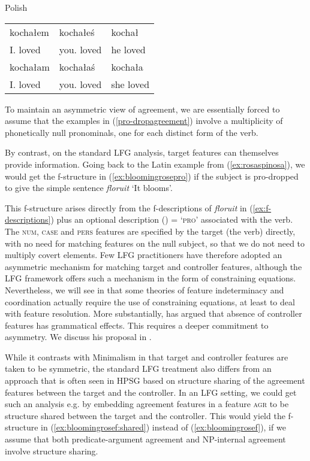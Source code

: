 \documentclass[output=paper,hidelinks]{langscibook}
\begin{document}
\ea\label{pro-dropagreement}Polish\\
\begin{tabular}[t]{lll}
  kocha\l{}em & kocha\l{}e\'{s} & kocha\l \\
  I.{\M} loved & you.{\M} loved & he loved \\
  kocha\l{}am & kocha\l{}a\'{s} & kocha\l{}a\\
  I.{\F} loved & you.{\F} loved & she loved \\
\end{tabular}
\z
%
To maintain an asymmetric view of agreement, we are essentially forced
to assume that the examples in (\ref{pro-dropagreement}) involve a multiplicity of
phonetically null pronominals, one for each distinct form of the
verb.

By contrast, on the standard LFG analysis, target features can themselves
provide information. Going back to the Latin example from
(\ref{ex:rosaspinosa}), we would get the f-structure in (\ref{ex:bloomingrosepro}) if the
subject is pro-dropped to give the simple sentence \textit{floruit} `It blooms'.

%
This f-structure arises directly from the f-descriptions of
\textit{floruit} in (\ref{ex:f-descriptions}) plus an optional
description (\UP\SUBJ\PRED) = \textsc{`pro'} associated with the
verb. The \textsc{num, case} and \textsc{pers} features are specified
by the target (the verb) directly, with no need for matching features
on the null subject, so that we do not need to multiply covert
elements.  Few LFG practitioners have therefore adopted an asymmetric
mechanism for matching target and controller features, although the
LFG framework offers such a mechanism in the form of constraining
equations. Nevertheless, we will see in 
that some theories of feature indeterminacy and coordination actually
require the use of constraining equations, at least to deal with
feature resolution. More substantially, \citet{Wechsler:Mixed} has
argued that absence of controller features has grammatical
effects. This requires a deeper commitment to asymmetry. We discuss
his proposal in .

While it contrasts with Minimalism in that target and controller
features are taken to be symmetric, the standard LFG treatment also
differs from an approach that is often seen in HPSG based on
structure sharing of the agreement features between the target and the
controller. In an LFG setting, we could get such an analysis e.g. by
embedding agreement features in a feature \textsc{agr} to be structure
shared between the target and the controller. This would yield the
f-structure in (\ref{ex:bloomingrosef:shared}) instead of (\ref{ex:bloomingrosef}), if we assume
that both predicate-argument agreement and NP-internal agreement
involve structure sharing.
\end{document}
